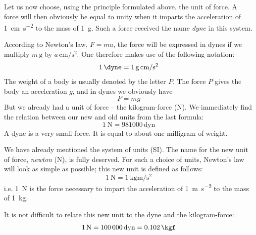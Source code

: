 Let us now choose, using the principle formulated
above. the unit of force. A force will then obviously be
equal to unity when it imparts the acceleration of \SI{1}{\centi\meter\per\second\squared} to the mass of \SI{1}{\gram}. Such a force received the name \emph{dyne} in this system.

According to Newton's law, $F = ma$, the force will
be expressed in dynes if we multiply $m \, \si{\gram}$ by $a \, \si{\centi\meter\per\second\squared}$. One
therefore makes use of the following notation:
\begin{equation*}%
\SI{1}{\dyne} = \SI{1}{\gram\centi\meter\per\second\squared}
\end{equation*}
The weight of a body is usually denoted by the letter
$P$. The force $P$ gives the body an acceleration $g$, and in
dynes we obviously have
\begin{equation*}%
P = mg
\end{equation*}
But we already had a unit of force -- the kilogram-force
(\si{\newton}). We immediately find the relation between our
new and old units from the last formula:
\begin{equation*}%
\SI{1}{\newton} = \num{981 000} \, \textrm{dyn}
\end{equation*}
A dyne is a very small force. It is equal to about one
milligram of weight.

We have already mentioned the system of units (SI).
The name for the new unit of force, \emph{newton} (N), is fully
deserved. For such a choice of units, Newton's law will
look as simple as possible; this new unit is defined as
follows:
\begin{equation*}%
\SI{1}{\newton} = \SI{1}{\kilo\gram\meter\per\second\squared}
\end{equation*}
i.e. \SI{1}{\newton} is the force necessary to impart the acceleration
of \SI{1}{\meter\per\second\squared} to the mass of \SI{1}{\kilo\gram}.

It is not difficult to relate this new unit to the dyne and the kilogram-force:
\begin{equation*}%
\SI{1}{\newton} = \num{100000}\, \textrm{dyn} = \SI{0.102}{\kgf}
\end{equation*}



